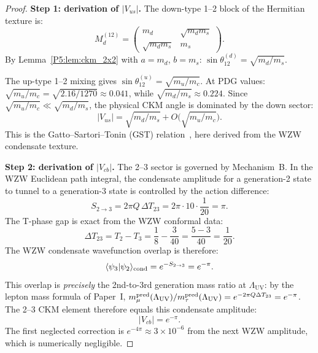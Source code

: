 \documentclass[11pt,a4paper]{article}
\theoremstyle{definition}
\theoremstyle{remark}
\newcommand{\LUV}{\Lambda_{\mathrm{UV}}}
\begin{document}
\begin{proof}
\textbf{Step 1: derivation of $|V_{us}|$.}
The down-type 1--2 block of the Hermitian texture is:
\begin{equation}
  M_d^{(12)} = \begin{pmatrix} m_d & \sqrt{m_dm_s} \\ \sqrt{m_dm_s} & m_s \end{pmatrix}.
\end{equation}
By Lemma~\ref{P5:lem:ckm_2x2} with $a=m_d$, $b=m_s$:
$\sin\theta_{12}^{(d)} = \sqrt{m_d/m_s}$.

The up-type 1--2 mixing gives
$\sin\theta_{12}^{(u)} = \sqrt{m_u/m_c}$.
At PDG values: $\sqrt{m_u/m_c} = \sqrt{2.16/1270} \approx 0.041$,
while $\sqrt{m_d/m_s} \approx 0.224$.
Since $\sqrt{m_u/m_c} \ll \sqrt{m_d/m_s}$, the physical CKM angle
is dominated by the down sector:
\begin{equation}
  |V_{us}| = \sqrt{m_d/m_s} + O\!\bigl(\sqrt{m_u/m_c}\bigr).
\end{equation}
This is the Gatto--Sartori--Tonin (GST) relation~\cite{GST1968,Cabibbo1963},
here derived from the WZW condensate texture.

\medskip
\textbf{Step 2: derivation of $|V_{cb}|$.}
The 2--3 sector is governed by Mechanism~B.
In the WZW Euclidean path integral, the condensate amplitude for a
generation-2 state to tunnel to a generation-3 state is controlled
by the action difference:
\begin{equation}
  S_{2\to3} = 2\pi Q\,\Delta T_{23} = 2\pi \cdot 10 \cdot \frac{1}{20} = \pi.
  \label{P5:eq:action_23}
\end{equation}
The T-phase gap is exact from the WZW conformal data:
\begin{equation}
  \Delta T_{23} = T_2 - T_3
  = \frac{1}{8} - \frac{3}{40}
  = \frac{5-3}{40} = \frac{1}{20}.
  \label{P5:eq:DeltaT23}
\end{equation}
The WZW condensate wavefunction overlap is therefore:
\begin{equation}
  \langle\psi_3|\psi_2\rangle_{\rm cond} = e^{-S_{2\to3}} = e^{-\pi}.
  \label{P5:eq:overlap23}
\end{equation}
This overlap is \emph{precisely} the 2nd-to-3rd generation mass ratio
at $\LUV$: by the lepton mass formula of Paper~I,
$m_\mu^{\rm pred}(\LUV)/m_\tau^{\rm pred}(\LUV) = e^{-2\pi Q \Delta T_{23}} = e^{-\pi}$.
The 2--3 CKM element therefore equals this condensate amplitude:
\begin{equation}
  |V_{cb}| = e^{-\pi}.
\end{equation}
The first neglected correction is $e^{-4\pi} \approx 3\times10^{-6}$
from the next WZW amplitude, which is numerically negligible.


\end{proof}
\end{document}
